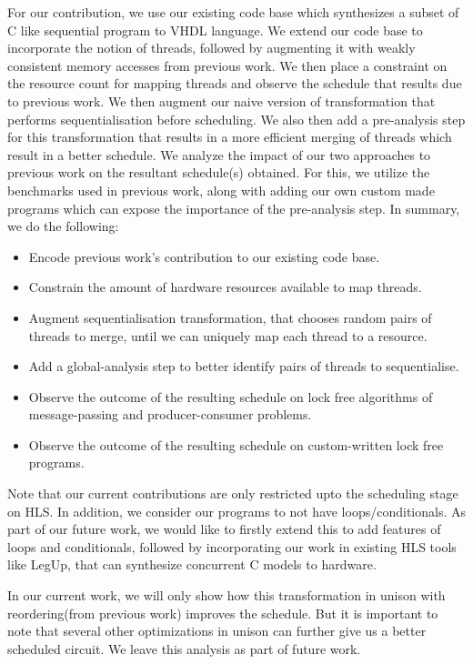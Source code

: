 \documentclass[sigplan,10pt,review]{acmart}
\begin{document}
        For our contribution, we use our existing code base which synthesizes a subset of C like sequential program to VHDL language. 
        We extend our code base to incorporate the notion of threads, followed by augmenting it with weakly consistent memory accesses from previous work. 
        We then place a constraint on the resource count for mapping threads and observe the schedule that results due to previous work. 
        We then augment our naive version of transformation that performs sequentialisation before scheduling.
        We also then add a pre-analysis step for this transformation that results in a more efficient merging of threads which result in a better schedule.  
        We analyze the impact of our two approaches to previous work on the resultant schedule(s) obtained.
        For this, we utilize the benchmarks used in previous work, along with adding our own custom made programs which can expose the importance of the pre-analysis step.  
        In summary, we do the following:
        \begin{itemize}
            \item Encode previous work's contribution to our existing code base.
            \item Constrain the amount of hardware resources available to map threads. 
            \item Augment sequentialisation transformation, that chooses random pairs of threads to merge, until we can uniquely map each thread to a resource.
            \item Add a global-analysis step to better identify pairs of threads to sequentialise.
            \item Observe the outcome of the resulting schedule on lock free algorithms of message-passing and producer-consumer problems.
            \item Observe the outcome of the resulting schedule on custom-written lock free programs.  
        \end{itemize}
        
        Note that our current contributions are only restricted upto the scheduling stage on HLS.
        In addition, we consider our programs to not have loops/conditionals.
        As part of our future work, we would like to firstly extend this to add features of loops and conditionals, followed by incorporating our work in existing HLS tools like LegUp, that can synthesize concurrent C models to hardware.

        In our current work, we will only show how this transformation in unison with reordering(from previous work) improves the schedule.
        But it is important to note that several other optimizations in unison can further give us a better scheduled circuit.
        We leave this analysis as part of future work.
\end{document}
